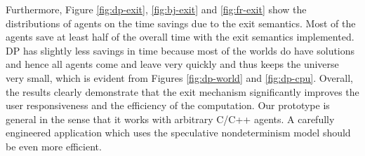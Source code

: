 Furthermore, Figure \ref{fig:dp-exit}, \ref{fig:bj-exit} and 
\ref{fig:fr-exit} show the distributions of agents on the time savings due to
the exit semantics. Most of the agents save at least half of the overall time
with the exit semantics implemented. DP has slightly less savings in time because
most of the worlds do have solutions and hence all agents come and leave very quickly
and thus keeps the universe very small, which is evident from Figures
\ref{fig:dp-world} and \ref{fig:dp-cpu}.
Overall, the results clearly demonstrate
that the exit mechanism significantly improves the user responsiveness and 
the efficiency of the computation.
Our prototype is general in the sense that it
works with arbitrary C/C++ agents. A carefully engineered
application which uses the speculative nondeterminism model
should be even more efficient.
